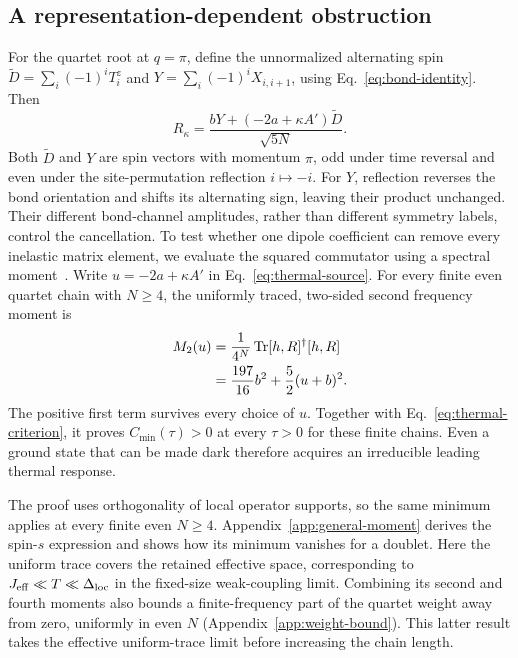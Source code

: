 \subsection{A representation-dependent obstruction}

For the quartet root at $q=\pi$, define the unnormalized alternating spin
$\widetilde D=\sum_i(-1)^iT_i^z$ and
$Y=\sum_i(-1)^iX_{i,i+1}$, using Eq.~\eqref{eq:bond-identity}. Then
\begin{equation}
 R_\kappa=\frac{bY+(-2a+\kappa A')\widetilde D}{\sqrt{5N}}.
 \label{eq:thermal-source}
\end{equation}
Both $\widetilde D$ and $Y$ are spin vectors with momentum $\pi$,
odd under time reversal and even under the site-permutation reflection
$i\mapsto-i$. For $Y$, reflection reverses the bond orientation and
shifts its alternating sign, leaving their product unchanged.
Their different bond-channel amplitudes, rather than different symmetry
labels, control the cancellation. To test whether one dipole coefficient
can remove every inelastic matrix element, we evaluate the squared
commutator using a spectral moment~\cite{mueller1982sumrules}.
Write $u=-2a+\kappa A'$ in Eq.~\eqref{eq:thermal-source}.
For every finite even quartet chain with $N\ge4$, the uniformly traced,
two-sided second frequency moment is
\begin{align}
 M_2(u)&=\frac{1}{4^N}\operatorname{Tr}[h,R]^\dagger[h,R]\notag\\
 &=\frac{197}{16}b^2+\frac52(u+b)^2.
 \label{eq:quartet-moment}
\end{align}
The positive first term survives every choice of $u$.
Together with Eq.~\eqref{eq:thermal-criterion}, it proves
$C_{\min}(\tau)>0$ at every $\tau>0$ for these finite chains.
Even a ground state that can be made dark therefore acquires an
irreducible leading thermal response.

The proof uses orthogonality of local operator supports, so the same
minimum applies at every finite even $N\ge4$.
Appendix~\ref{app:general-moment} derives the spin-$s$ expression and
shows how its minimum vanishes for a doublet.
Here the uniform trace covers the retained effective space, corresponding
to $J_{\rm eff}\ll T\ll\Delta_{\mathrm{loc}}$ in the fixed-size weak-coupling limit.
Combining its second and fourth moments also bounds a finite-frequency
part of the quartet weight away from zero, uniformly in even $N$
(Appendix~\ref{app:weight-bound}). This latter result takes the effective
uniform-trace limit before increasing the chain length.

